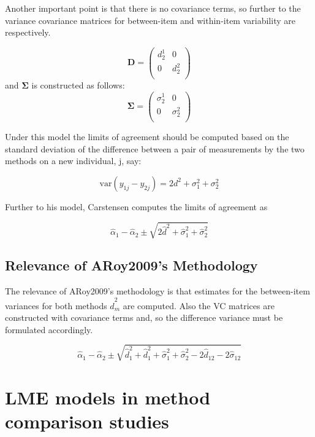 \documentclass[12pt, a4paper]{report}
\theoremstyle{plain}
\theoremstyle{definition}
\theoremstyle{remark}
\begin{document}
	Another important point is that there is no covariance terms, so
	further to  \citet{BXC2008} the variance covariance matrices for
	between-item and within-item variability are respectively.
	
	\[\boldsymbol{D} = \left(
	\begin{array}{cc}
	d^1_2  & 0 \\
	0 & d^2_2 \\
	\end{array}
	\right) \]
	and  $\boldsymbol{\Sigma}$ is constructed as follows:
	\[\boldsymbol{\Sigma} = \left(
	\begin{array}{cc}
	\sigma^1_2  & 0 \\
	0 & \sigma^2_2 \\
	\end{array}
	\right) \]
	
	
	Under this model the limits of agreement should be computed based
	on the standard deviation of the difference between a pair of
	measurements by the two methods on a new individual, j, say:
	
	\[ \mbox{var}(y_{1j} - y_{2j}) = 2d^2 + \sigma^2_1 + \sigma^2_2  \]
	
	Further to his model, Carstensen computes the limits of agreement
	as
	
	\[
	\hat{\alpha}_1 - \hat{\alpha}_2 \pm \sqrt{2 \hat{d}^2 + 	\hat{\sigma}^2_1 + \hat{\sigma}^2_2}
	\]
	
	
	\subsection{Relevance of ARoy2009's Methodology}
	
	The relevance of ARoy2009's methodology is that estimates for the between-item variances for both methods $\hat{d}^2_m$ are computed. Also the VC matrices are constructed with covariance
	terms and, so the difference variance must be formulated accordingly.
	
	
	\[
	\hat{\alpha}_1 - \hat{\alpha}_2 \pm \sqrt{ \hat{d}^2_1  +
		\hat{d}^2_1 + \hat{\sigma}^2_1 + \hat{\sigma}^2_2 - 2 \hat{d}_{12}
		- 2 \hat{\sigma}_12}
	\]
	
	\newpage
	
	
	
	\section{LME models in method comparison studies}
	
\end{document}
